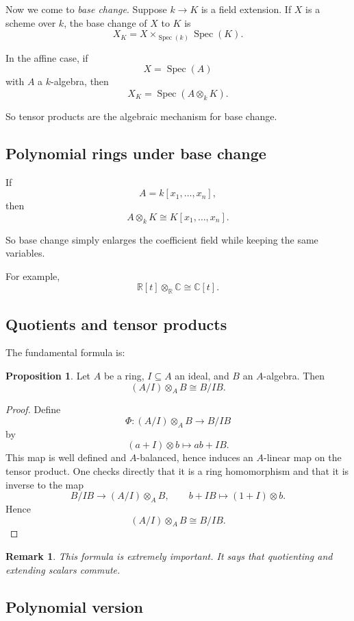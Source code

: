 \documentclass[12pt,a4paper]{article}
\theoremstyle{notespace}
\newtheorem{remark}{Remark}[section]
\newcommand{\Spec}{\operatorname{Spec}}
\newcommand{\R}{\mathbb R}
\newcommand{\C}{\mathbb C}
\theoremstyle{definition}
\newtheorem{proposition}[definition]{Proposition}
\begin{document}
	Now we come to \emph{base change}.  
	Suppose \(k\to K\) is a field extension. If \(X\) is a scheme over \(k\), the base change of \(X\) to \(K\) is
	\[
	X_K = X\times_{\Spec(k)} \Spec(K).
	\]
	
	In the affine case, if
	\[
	X=\Spec(A)
	\]
	with \(A\) a \(k\)-algebra, then
	\[
	X_K=\Spec(A\otimes_k K).
	\]
	
	So tensor products are the algebraic mechanism for base change.
	
	\subsection{Polynomial rings under base change}
	
	If
	\[
	A=k[x_1,\dots,x_n],
	\]
	then
	\[
	A\otimes_k K \cong K[x_1,\dots,x_n].
	\]
	
	So base change simply enlarges the coefficient field while keeping the same variables.
	
	For example,
	\[
	\R[t]\otimes_{\R}\C \cong \C[t].
	\]
	
	\subsection{Quotients and tensor products}
	
	The fundamental formula is:
	
	\begin{proposition}
		Let \(A\) be a ring, \(I\subseteq A\) an ideal, and \(B\) an \(A\)-algebra. Then
		\[
		(A/I)\otimes_A B \cong B/IB.
		\]
	\end{proposition}
	
	\begin{proof}
		Define
		\[
		\Phi:(A/I)\otimes_A B \longrightarrow B/IB
		\]
		by
		\[
		(a+I)\otimes b \longmapsto ab + IB.
		\]
		This map is well defined and \(A\)-balanced, hence induces an \(A\)-linear map on the tensor product. One checks directly that it is a ring homomorphism and that it is inverse to the map
		\[
		B/IB \longrightarrow (A/I)\otimes_A B,
		\qquad
		b+IB \longmapsto (1+I)\otimes b.
		\]
		Hence
		\[
		(A/I)\otimes_A B \cong B/IB.
		\]
	\end{proof}
	
	\begin{remark}
		This formula is extremely important. It says that quotienting and extending scalars commute.
	\end{remark}
	
	\subsection{Polynomial version}
	
\end{document}
